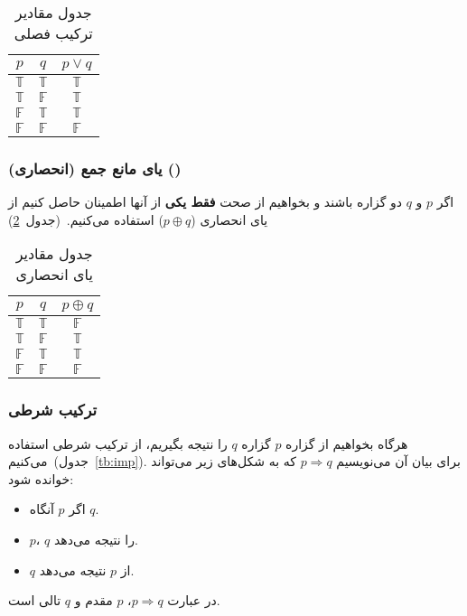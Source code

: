 \documentclass[a4paper, margin=1in]{article}
\newcommand{\T}{\mathbb{T}}
\newcommand{\F}{\mathbb{F}}
\newcommand{\reft}[1]{~(جدول~\ref{tb:#1})}
\begin{document}
\begin{table}[h]\centering
  \begin{LTR}
    \begin{tabular}{c c|c}
      $p$ & $q$ & $p \lor q$ \\
      \hline
      $\T$ & $\T$ & $\T$ \\
      $\T$ & $\F$ & $\T$ \\
      $\F$ & $\T$ & $\T$ \\
      $\F$ & $\F$ & $\F$ \\
    \end{tabular}
  \end{LTR}
  \caption{جدول مقادیر ترکیب فصلی}\label{tb:or}
\end{table}

\subsubsection{یای مانع جمع (انحصاری) ()}
اگر $p$ و $q$ دو گزاره باشند و بخواهیم از صحت \textbf{فقط یکی} از آنها اطمینان حاصل کنیم از یای انحصاری ($p \oplus q$) استفاده می‌کنیم.\reft{xor}

\begin{table}[h]\centering
  \begin{LTR}
    \begin{tabular}{c c|c}
      $p$ & $q$ & $p \oplus q$ \\
      \hline
      $\T$ & $\T$ & $\F$ \\
      $\T$ & $\F$ & $\T$ \\
      $\F$ & $\T$ & $\T$ \\
      $\F$ & $\F$ & $\F$ \\
    \end{tabular}
  \end{LTR}
  \caption{جدول مقادیر یای انحصاری}\label{tb:xor}
\end{table}

\subsubsection{ترکیب شرطی}
هرگاه بخواهیم از گزاره $p$ گزاره $q$ را نتیجه بگیریم، از ترکیب شرطی استفاده می‌کنیم\reft{imp}. برای بیان آن می‌نویسیم $p \Rightarrow q$ که به شکل‌های زیر می‌تواند خوانده شود:
\begin{itemize}
  \item اگر $p$ آنگاه $q$.
  \item $p$، $q$ را نتیجه می‌دهد.
  \item $q$ از $p$ نتیجه می‌دهد.
\end{itemize}
در عبارت $p \Rightarrow q$، $p$ مقدم و $q$ تالی است.
\end{document}
